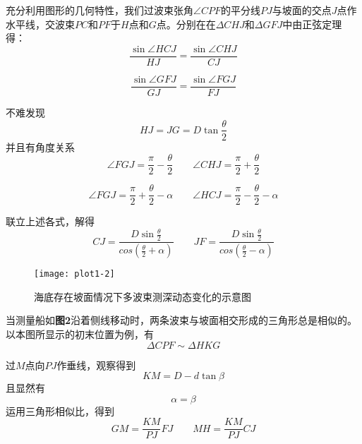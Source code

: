 \documentclass{cumcmthesis}
\begin{document}
充分利用图形的几何特性，我们过波束张角$\angle CPF$的平分线$PJ$与坡面的交点$J$点作水平线，交波束$PC$和$PF$于$H$点和$G$点。分别在在$\Delta CHJ$和$\Delta GFJ$中由正弦定理得：
\begin{equation}
\frac{\sin\angle HCJ}{HJ} = \frac{\sin\angle CHJ}{CJ}
\label{eq:eq1-1}
\end{equation}

\begin{equation}
\frac{\sin\angle GFJ}{GJ} = \frac{\sin\angle FGJ}{FJ}
\label{eq:eq1-2}
\end{equation}

不难发现
\begin{equation}
HJ = JG = D \tan\frac{\theta}{2}
\label{eq:eq1-3}
\end{equation}
并且有角度关系
\begin{equation}
\angle FGJ = \frac{\pi}{2}-\frac{\theta}{2}  \qquad \angle CHJ = \frac{\pi}{2}+\frac{\theta}{2}
\label{eq:eq1-4}
\end{equation}

\begin{equation}
\angle FGJ = \frac{\pi}{2}+\frac{\theta}{2}-\alpha \qquad \angle HCJ = \frac{\pi}{2}-\frac{\theta}{2}-\alpha
\label{eq:eq1-5}
\end{equation}

联立上述各式，解得
\begin{equation}
CJ= \frac{D \sin \frac{\theta}{2}}{cos(\frac{\theta}{2} + \alpha)} \qquad JF= \frac{D \sin \frac{\theta}{2}}{cos(\frac{\theta}{2} - \alpha)}
\label{eq:eq1-6}
\end{equation}

\begin{figure}[!h]
    \centering
    \texttt{[image: plot1-2]}
    \caption{海底存在坡面情况下多波束测深动态变化的示意图}
    \label{fig:plot1-2}
\end{figure}

当测量船如\textbf{图2}沿着侧线移动时，两条波束与坡面相交形成的三角形总是相似的。以本图所显示的初末位置为例，有
\begin{equation}
\Delta CPF \sim \Delta HKG
\label{eq:eq1-7}
\end{equation}

过$M$点向$PJ$作垂线，观察得到
\begin{equation}
KM = D - d \tan \beta
\label{eq:eq1-8}
\end{equation}
且显然有
\begin{equation}\alpha = \beta
\label{eq:eq1-9}
\end{equation}
运用三角形相似比，得到
\begin{equation}
GM = \frac{KM}{PJ} FJ \qquad MH = \frac{KM}{PJ} CJ
\label{eq:eq1-10}
\end{equation}
\end{document}
